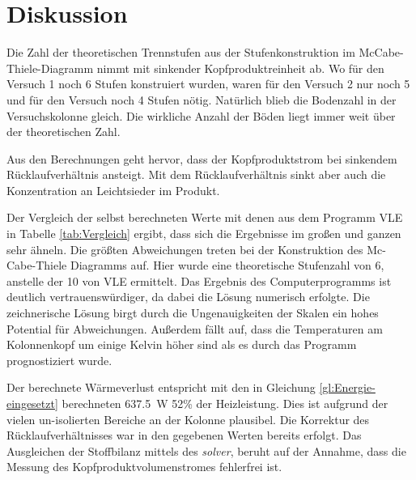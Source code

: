 \newpage
\section{Diskussion}
\label{sec:diskussion}

Die Zahl der theoretischen Trennstufen aus der Stufenkonstruktion im McCabe-Thiele-Diagramm nimmt mit sinkender Kopfproduktreinheit ab. Wo für den Versuch 1 noch 6 Stufen konstruiert wurden, waren für den Versuch 2 nur noch 5 und für den Versuch noch 4 Stufen nötig. Natürlich blieb die Bodenzahl in der Versuchskolonne gleich. Die wirkliche Anzahl der Böden liegt immer weit über der theoretischen Zahl.

Aus den Berechnungen geht hervor, dass der Kopfproduktstrom bei sinkendem Rücklaufverhältnis ansteigt. Mit dem Rücklaufverhältnis sinkt aber auch die Konzentration an Leichtsieder im Produkt.

Der Vergleich der selbst berechneten Werte mit denen aus dem Programm VLE in Tabelle \ref{tab:Vergleich} ergibt, dass sich die Ergebnisse im großen und ganzen sehr ähneln. Die größten Abweichungen treten bei der Konstruktion des Mc-Cabe-Thiele Diagramms auf. Hier wurde eine theoretische Stufenzahl von 6, anstelle der 10 von VLE ermittelt. Das Ergebnis des Computerprogramms ist deutlich vertrauenswürdiger, da dabei die Lösung numerisch erfolgte. Die zeichnerische Lösung birgt durch die Ungenauigkeiten der Skalen ein hohes Potential für Abweichungen. Außerdem fällt auf, dass die Temperaturen am Kolonnenkopf um einige Kelvin höher sind als es durch das Programm prognostiziert wurde.

Der berechnete Wärmeverlust entspricht mit den in Gleichung \eqref{gl:Energie-eingesetzt} berechneten \SI{637,5}{\watt} 52\% der Heizleistung. Dies ist aufgrund der vielen un-isolierten Bereiche an der Kolonne plausibel. Die Korrektur des Rücklaufverhältnisses war in den gegebenen Werten bereits erfolgt. Das Ausgleichen der Stoffbilanz mittels des \emph{solver}, beruht auf der Annahme, dass die Messung des Kopfproduktvolumenstromes fehlerfrei ist.

